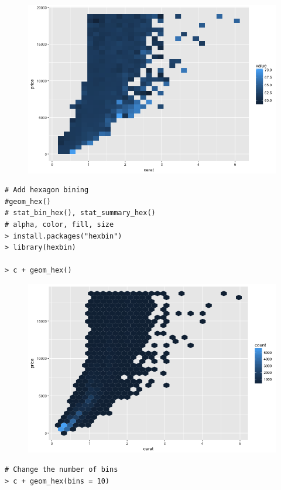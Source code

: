 \begin{figure}[H]\begin{center}\includegraphics[scale=1 ]{ilu/bg60.png}\end{center}\end{figure}
\begin{lstlisting}[language=html]
# Add hexagon bining
#geom_hex()
# stat_bin_hex(), stat_summary_hex()
# alpha, color, fill, size
> install.packages("hexbin")
> library(hexbin)

> c + geom_hex()
\end{lstlisting}
\begin{figure}[H]\begin{center}\includegraphics[scale=1 ]{ilu/bg61.png}\end{center}\end{figure}
\begin{lstlisting}[language=html]
# Change the number of bins
> c + geom_hex(bins = 10)
\end{lstlisting}

